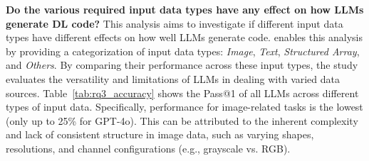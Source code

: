 \textbf{Do the various required input data types have any effect on how LLMs generate DL code?}
This analysis aims to investigate if different input data types have different effects on how well LLMs generate code. \tool enables this analysis by providing a categorization of input data types: \textit{Image}, \textit{Text}, \textit{Structured Array}, and \textit{Others}. By comparing their performance across these input types, the study evaluates 
the versatility and limitations of LLMs in dealing with varied data sources.
Table~\ref{tab:rq3_accuracy} shows the Pass@1 of all LLMs 
across different types of input data.
Specifically, performance for image-related tasks is the lowest (only up to 25\% for GPT-4o).
This can be attributed to the inherent complexity and lack of consistent structure in image data, such as varying shapes, resolutions, and channel configurations (e.g., grayscale vs. RGB). 



